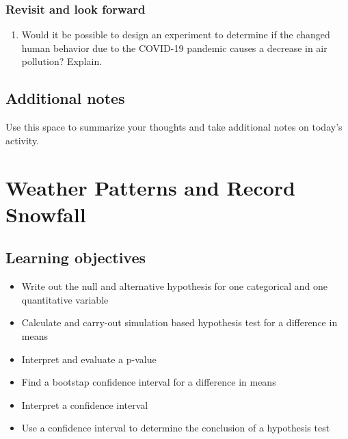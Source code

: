 \documentclass[
]{report}
\providecommand{\tightlist}{%
  \setlength{\itemsep}{0pt}\setlength{\parskip}{0pt}}
\begin{document}
\vspace{3in}

\hypertarget{revisit-and-look-forward}{%
\subsection*{Revisit and look forward}\label{revisit-and-look-forward}}

\begin{enumerate}
\def\labelenumi{\arabic{enumi}.}
\setcounter{enumi}{22}
\tightlist
\item
  Would it be possible to design an experiment to determine if the changed human behavior due to the COVID-19 pandemic causes a decrease in air pollution? Explain.
  \vspace{0.6in}
\end{enumerate}

\hypertarget{additional-notes}{%
\section{Additional notes}\label{additional-notes}}

Use this space to summarize your thoughts and take additional notes on today's activity.

\hypertarget{weather-patterns-and-record-snowfall}{%
\chapter{Weather Patterns and Record Snowfall}\label{weather-patterns-and-record-snowfall}}

\newcommand\latexcode[1]{#1}

\hypertarget{learning-objectives}{%
\section{Learning objectives}\label{learning-objectives}}

\begin{itemize}
\item
  Write out the null and alternative hypothesis for one categorical and one quantitative variable
\item
  Calculate and carry-out simulation based hypothesis test for a difference in means
\item
  Interpret and evaluate a p-value
\item
  Find a bootstap confidence interval for a difference in means
\item
  Interpret a confidence interval
\item
  Use a confidence interval to determine the conclusion of a hypothesis test
\end{itemize}
\end{document}
